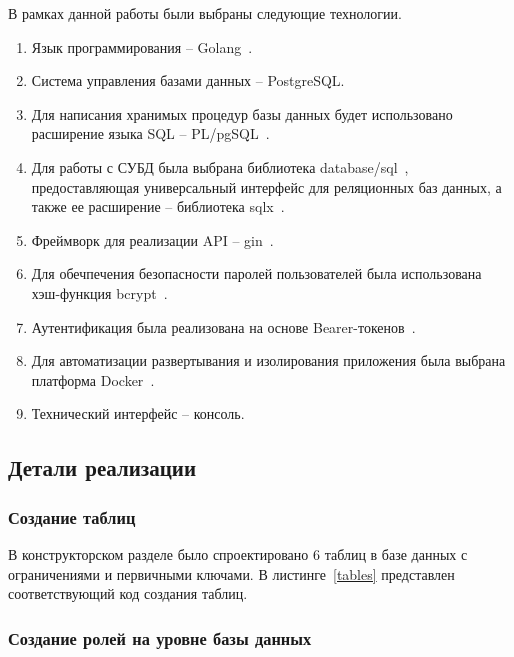В рамках данной работы были выбраны следующие технологии.
\begin{enumerate}[label=\arabic*)]
	\item Язык программирования -- Golang~\cite{go}.
	\item Система управления базами данных -- PostgreSQL. 
	\item Для написания хранимых процедур базы данных будет использовано расширение языка SQL -- PL/pgSQL~\cite{pgSQL}.
	\item Для работы с СУБД была выбрана библиотека database/sql~\cite{go-sql}, предоставляющая универсальный интерфейс для реляционных баз данных, а также ее расширение -- библиотека sqlx~\cite{sqlx}.
	\item Фреймворк для реализации API -- gin~\cite{gin}.
	\item Для обечпечения безопасности паролей пользователей была использована хэш-функция bcrypt~\cite{bcrypt}. 
	\item Аутентификация была реализована на основе Bearer-токенов~\cite{bearer}.
	\item Для автоматизации развертывания и изолирования приложения была выбрана платформа Docker~\cite{docker}. 
	\item Технический интерфейс -- консоль. 
\end{enumerate}

\newpage
\subsection{Детали реализации}

\subsubsection{Создание таблиц}

В конструкторском разделе было спроектировано 6 таблиц в базе данных с ограничениями и первичными ключами. В листинге~\ref{tables} представлен соответствующий код создания таблиц.  


\subsubsection{Создание ролей на уровне базы данных}

